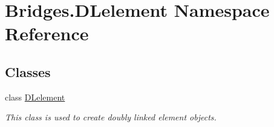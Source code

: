 \hypertarget{namespace_bridges_1_1_d_lelement}{}\section{Bridges.\+D\+Lelement Namespace Reference}
\label{namespace_bridges_1_1_d_lelement}
\subsection*{Classes}
\begin{DoxyCompactItemize}
\item 
class \mbox{\hyperlink{class_bridges_1_1_d_lelement_1_1_d_lelement}{D\+Lelement}}
\begin{DoxyCompactList}\small\item\em This class is used to create doubly linked element objects. \end{DoxyCompactList}\end{DoxyCompactItemize}
